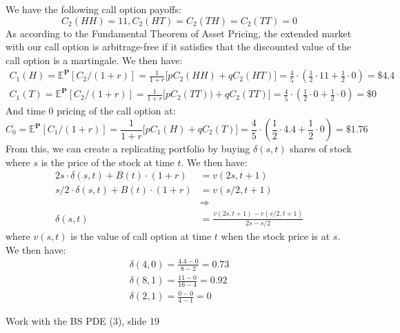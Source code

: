 \documentclass[12pt,twoside, letter]{exam}
\theoremstyle{definition}
\newcommand{\ee}{\mathbb{E}}
\begin{document}
  \begin{solution}
    We have the following call option payoffs:
    \begin{equation*}
      C_2(HH) = 11, C_2(HT) = C_2(TH) = C_2(TT) = 0
    \end{equation*}
    As according to the Fundamental Theorem of Asset Pricing, the extended market with our call option is arbitrage-free if it satisfies
    that the discounted value of the call option is a martingale. We then have:
    \begin{align*}
      C_1(H) = \ee^{\mathbf{P}}[C_2/(1+r)] = \frac{1}{1+r}\big[pC_2(HH) + qC_2(HT)\big] = \frac{4}{5}\cdot(\frac{1}{2}\cdot 11 + \frac{1}{2}\cdot 0) = \$ 4.4 \\
      C_1(T) = \ee^{\mathbf{P}}[C_2/(1+r)] = \frac{1}{1+r}\big[pC_2(TT)) + qC_2(TT)\big] = \frac{4}{5}\cdot(\frac{1}{2}\cdot 0 + \frac{1}{2}\cdot 0) = \$ 0
    \end{align*}
    And time 0 pricing of the call option at:
    \begin{equation*}
      C_0 = \ee^{\mathbf{P}}[C_1/(1+r)] = \frac{1}{1+r}\big[pC_1(H) + qC_2(T)\big] = \frac{4}{5}\cdot(\frac{1}{2}\cdot 4.4 + \frac{1}{2}\cdot 0) = \$ 1.76
    \end{equation*}
    From this, we can create a replicating portfolio by buying $\delta(s,t)$ shares of stock where $s$ is the price of the stock at time $t$.
    We then have:
    \begin{align*}
      2s \cdot \delta(s,t) + B(t)\cdot(1+r) &= v(2s, t+1) \\
      s/2 \cdot \delta(s,t) + B(t)\cdot(1+r) &= v(s/2, t+1) \\
      &\Rightarrow \\
      \delta(s,t) &= \frac{v(2s,t+1) - v(s/2, t+1)}{2s - s/2}
    \end{align*}
    where $v(s,t)$ is the value of call option at time $t$ when the stock price is at $s$. We then have:
    \begin{align*}
      \delta(4, 0) = \frac{4.4 - 0}{8 - 2} = 0 .73\\
      \delta(8, 1) = \frac{11 - 0}{16 - 4} = 0.92\\
      \delta(2, 1) = \frac{0 - 0}{4 - 1} = 0
    \end{align*}

  \end{solution}

\par{Work with the BS PDE (3), slide 19}
\end{document}
